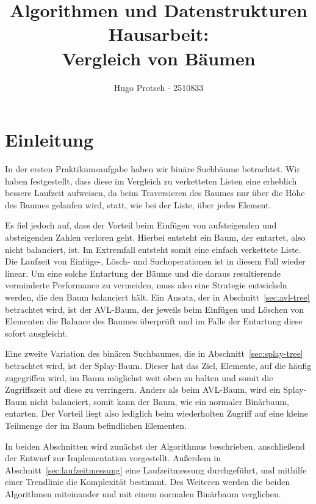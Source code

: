 \documentclass[a4paper]{article}
\title{Algorithmen und Datenstrukturen Hausarbeit:\\Vergleich von Bäumen}
\author{Hugo Protsch - 2510833}
\begin{document}
    \maketitle
    \tableofcontents
    \newpage
    \section*{Einleitung}\label{sec:Einleitung}

    In der ersten Praktikumsaufgabe haben wir binäre Suchbäume betrachtet.
    Wir haben festgestellt, dass diese im Vergleich zu verketteten Listen eine erheblich
    bessere Laufzeit aufweisen, da beim Traversieren des Baumes nur über die
    Höhe des Baumes gelaufen wird, statt, wie bei der Liste, über jedes Element.

    Es fiel jedoch auf, dass der Vorteil beim Einfügen von aufsteigenden und
    absteigenden Zahlen verloren geht.
    Hierbei entsteht ein Baum, der entartet, also nicht balanciert, ist.
    Im Extremfall entsteht somit eine einfach verkettete Liste.
    Die Laufzeit von Einfüge-, Lösch- und Suchoperationen
    ist in diesem Fall wieder linear.
    Um eine solche Entartung der Bäume und die daraus resultierende verminderte Performance
    zu vermeiden, muss also eine Strategie entwickeln werden, die den Baum balanciert hält.
    Ein Ansatz, der in Abschnitt~\ref{sec:avl-tree} betrachtet wird, ist der AVL-Baum,
    der jeweils beim Einfügen und Löschen von Elementen die
    Balance des Baumes überprüft und im Falle der Entartung diese sofort ausgleicht.

    Eine zweite Variation des binären Suchbaumes, die in Abschnitt~\ref{sec:splay-tree}
    betrachtet wird, ist der Splay-Baum.
    Dieser hat das Ziel, Elemente, auf die häufig zugegriffen wird, im Baum möglichst weit oben zu
    halten und somit die Zugriffszeit auf diese zu verringern.
    Anders als beim AVL-Baum, wird ein Splay-Baum nicht balanciert, somit kann der Baum, wie ein
    normaler Binärbaum, entarten.
    Der Vorteil liegt also lediglich beim wiederholten Zugriff auf eine kleine Teilmenge der im
    Baum befindlichen Elementen.

    In beiden Abschnitten wird zunächst der Algorithmus beschrieben, anschließend der Entwurf zur
    Implementation vorgestellt.
    Außerdem in Abschnitt~\ref{sec:laufzeitmessung} eine Laufzeitmessung durchgeführt, und mithilfe einer
    Trendlinie die Komplexität bestimmt.
    Des Weiteren werden die beiden Algorithmen miteinander und mit einem normalen Binärbaum
    verglichen.
\end{document}
